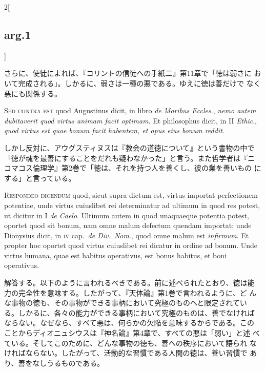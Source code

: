 \documentclass[paper=a4paper,fontsize=10pt,jafontsize=9pt,titlepage]{jlreq}
\begin{document}
\begin{paracol}{2}[\subsection{arg.1}]
\switchcolumn

さらに、使徒によれば、『コリントの信徒への手紙二』第11章で「徳は弱さに
おいて完成される」。しかるに、弱さは一種の悪である。ゆえに徳は善だけで
なく悪にも関係する。

\switchcolumn*[\subsection{s.c.}]

{\scshape Sed contra est} quod Augustinus dicit, in libro {\itshape de
Moribus Eccles}., {\itshape nemo autem dubitaverit quod virtus animam
facit optimam}. Et philosophus dicit, in II {\itshape Ethic}.,
{\itshape quod virtus est quae bonum facit habentem, et opus eius
bonum reddit}.

\switchcolumn

しかし反対に、アウグスティヌスは『教会の道徳について』という書物の中で
「徳が魂を最善にすることをだれも疑わなかった」と言う。また哲学者は『ニ
コマコス倫理学』第2巻で「徳は、それを持つ人を善くし、彼の業を善いもの
にする」と言っている。


{\scshape Respondeo dicendum} quod, sicut supra dictum est, virtus
importat perfectionem potentiae, unde virtus cuiuslibet rei
determinatur ad ultimum in quod res potest, ut dicitur in I {\itshape
de Caelo}. Ultimum autem in quod unaquaeque potentia potest, oportet
quod sit bonum, nam omne malum defectum quendam importat; unde
Dionysius dicit, in {\scshape iv} cap.~{\itshape de Div.~Nom}., quod
omne malum est {\itshape infirmum}. Et propter hoc oportet quod virtus
cuiuslibet rei dicatur in ordine ad bonum. Unde virtus humana, quae
est habitus operativus, est bonus habitus, et boni operativus.

\switchcolumn

解答する。以下のように言われるべきである。前に述べられたとおり、徳は能
力の完全性を意味する。したがって、『天体論』第1巻で言われるように、ど
んな事物の徳も、その事物ができる事柄において究極のものへと限定されてい
る。しかるに、各々の能力ができる事柄において究極のものは、善でなければ
ならない。なぜなら、すべて悪は、何らかの欠陥を意味するからである。この
ことからディオニュシウスは『神名論』第4章で、すべての悪は「弱い」と述
べている。そしてこのために、どんな事物の徳も、善への秩序において語られ
なければならない。したがって、活動的な習慣である人間の徳は、善い習慣で
あり、善をなしうるものである。


\end{paracol}
\end{document}
